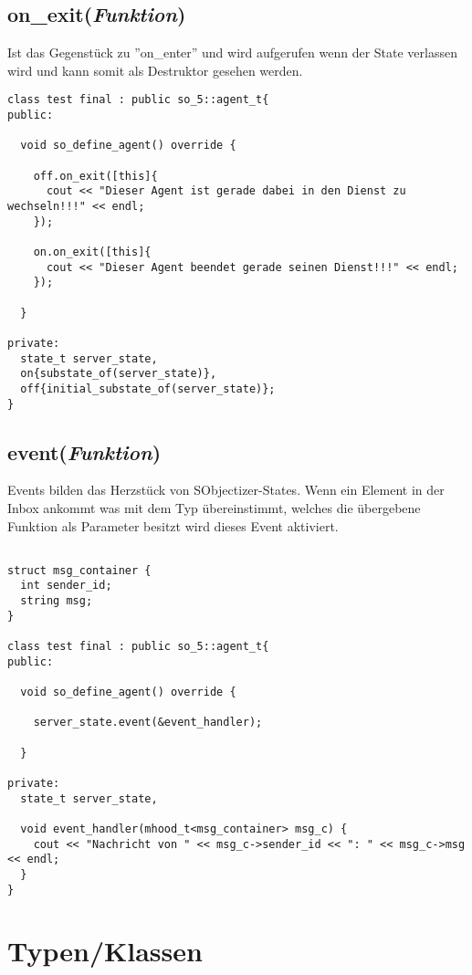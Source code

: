 \subsection{on\_exit(\textit{Funktion})}
Ist das Gegenstück zu ''on\_enter'' und wird aufgerufen wenn der State verlassen wird und kann somit als Destruktor
gesehen werden.

\begin{verbatim}
class test final : public so_5::agent_t{
public:

  void so_define_agent() override {
  
    off.on_exit([this]{
      cout << "Dieser Agent ist gerade dabei in den Dienst zu wechseln!!!" << endl;
    });
    
    on.on_exit([this]{
      cout << "Dieser Agent beendet gerade seinen Dienst!!!" << endl;
    });
  
  }

private:
  state_t server_state,
  on{substate_of(server_state)},
  off{initial_substate_of(server_state)};
}
\end{verbatim}

\subsection{event(\textit{Funktion})}
Events bilden das Herzstück von SObjectizer-States. Wenn ein Element in der Inbox ankommt was
mit dem Typ übereinstimmt, welches die übergebene Funktion als Parameter besitzt wird dieses Event
aktiviert.

\begin{verbatim}

struct msg_container {
  int sender_id;
  string msg;
}

class test final : public so_5::agent_t{
public:

  void so_define_agent() override {
  
    server_state.event(&event_handler);
  
  }

private:
  state_t server_state,
  
  void event_handler(mhood_t<msg_container> msg_c) {
    cout << "Nachricht von " << msg_c->sender_id << ": " << msg_c->msg << endl;
  }
}
\end{verbatim}

\section{Typen/Klassen}

